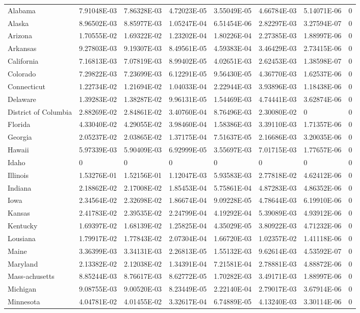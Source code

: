 \begin{longtable}[c]{p{0.75in}p{0.75in}p{0.75in}p{0.75in}p{0.75in}p{0.75in}p{0.75in}p{0.75in}}
Alabama & 7.91048E-03 & 7.86328E-03 & 4.72023E-05 & 3.55049E-05 & 4.66784E-03 & 5.14071E-06 & 0 \tabularnewline
Alaska & 8.96502E-03 & 8.85977E-03 & 1.05247E-04 & 6.51454E-06 & 2.82297E-03 & 3.27594E-07 & 0 \tabularnewline
Arizona & 1.70555E-02 & 1.69322E-02 & 1.23202E-04 & 1.80226E-04 & 2.27385E-03 & 1.88997E-06 & 0 \tabularnewline
Arkansas & 9.27803E-03 & 9.19307E-03 & 8.49561E-05 & 4.59383E-04 & 3.46429E-03 & 2.73415E-06 & 0 \tabularnewline
California & 7.16813E-03 & 7.07819E-03 & 8.99402E-05 & 4.02651E-03 & 2.62453E-03 & 1.38598E-07 & 0 \tabularnewline
Colorado & 7.29822E-03 & 7.23699E-03 & 6.12291E-05 & 9.56430E-05 & 4.36770E-03 & 1.62537E-06 & 0 \tabularnewline
Connecticut & 1.22734E-02 & 1.21694E-02 & 1.04033E-04 & 2.22944E-03 & 3.93896E-03 & 1.18438E-06 & 0 \tabularnewline
Delaware & 1.39283E-02 & 1.38287E-02 & 9.96131E-05 & 1.54469E-03 & 4.74441E-03 & 3.62874E-06 & 0 \tabularnewline
District of Columbia & 2.88269E-02 & 2.84861E-02 & 3.40760E-04 & 8.76496E-03 & 2.30080E-02 & 0 & 0 \tabularnewline
Florida & 4.33040E-02 & 4.29055E-02 & 3.98460E-04 & 1.58386E-03 & 3.39110E-03 & 1.71357E-06 & 0 \tabularnewline
Georgia & 2.05237E-02 & 2.03865E-02 & 1.37175E-04 & 7.51637E-05 & 2.16686E-03 & 3.20035E-06 & 0 \tabularnewline
Hawaii & 5.97339E-03 & 5.90409E-03 & 6.92999E-05 & 3.55697E-03 & 7.01715E-03 & 1.77657E-06 & 0 \tabularnewline
Idaho & 0 & 0 & 0 & 0 & 0 & 0 & 0 \tabularnewline
Illinois & 1.53276E-01 & 1.52156E-01 & 1.12047E-03 & 5.93583E-03 & 2.77818E-02 & 4.62412E-06 & 0 \tabularnewline
Indiana & 2.18862E-02 & 2.17008E-02 & 1.85453E-04 & 5.75861E-04 & 4.87283E-03 & 4.86352E-06 & 0 \tabularnewline
Iowa & 2.34564E-02 & 2.32698E-02 & 1.86674E-04 & 9.09228E-05 & 4.78644E-03 & 6.19910E-06 & 0 \tabularnewline
Kansas & 2.41783E-02 & 2.39535E-02 & 2.24799E-04 & 4.19292E-04 & 5.39089E-03 & 4.93912E-06 & 0 \tabularnewline
Kentucky & 1.69397E-02 & 1.68139E-02 & 1.25825E-04 & 4.35029E-05 & 3.80922E-03 & 4.71232E-06 & 0 \tabularnewline
Lousiana & 1.79917E-02 & 1.77843E-02 & 2.07304E-04 & 1.66720E-03 & 1.02357E-02 & 1.41118E-06 & 0 \tabularnewline
Maine & 3.36399E-03 & 3.34131E-03 & 2.26813E-05 & 1.55132E-03 & 9.62614E-03 & 4.53592E-07 & 0 \tabularnewline
Maryland & 2.13382E-02 & 2.12038E-02 & 1.34391E-04 & 7.21581E-04 & 2.78881E-03 & 4.88872E-06 & 0 \tabularnewline
Mass-achusetts & 8.85244E-03 & 8.76617E-03 & 8.62772E-05 & 1.70282E-03 & 3.49171E-03 & 1.88997E-06 & 0 \tabularnewline
Michigan & 9.08755E-03 & 9.00520E-03 & 8.23449E-05 & 2.22140E-04 & 2.79017E-03 & 3.67914E-06 & 0 \tabularnewline
Minnesota & 4.04781E-02 & 4.01455E-02 & 3.32617E-04 & 6.74889E-05 & 4.13240E-03 & 3.30114E-06 & 0 \tabularnewline

\end{longtable}
